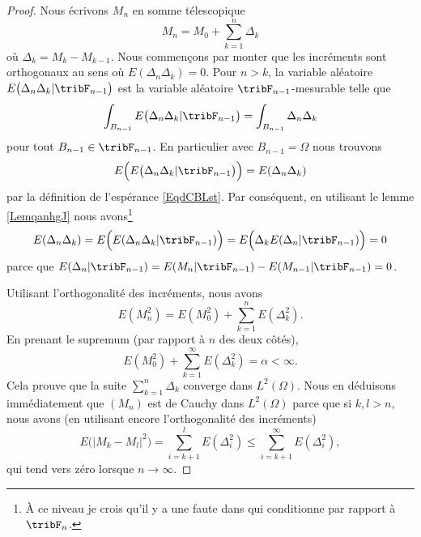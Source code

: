 \begin{proof}
    Nous écrivons \( M_n\) en somme télescopique
    \begin{equation}
        M_n=M_0+\sum_{k=1}^n\Delta_k
    \end{equation}
    où \( \Delta_k=M_k-M_{k-1}\). Nous commençons par monter que les incréments sont orthogonaux au sens où \( E(\Delta_n\Delta_k)=0\). Pour \( n>k\), la variable aléatoire \( E\big( \Delta_n\Delta_k|\tribF_{n-1} \big)\) est la variable aléatoire \( \tribF_{n-1}\)-mesurable telle que
    \begin{equation}
        \int_{B_{n-1}}E\big( \Delta_n\Delta_k|\tribF_{n-1} \big)=\int_{B_{n-1}}\Delta_n\Delta_k
    \end{equation}
    pour tout \( B_{n-1}\in\tribF_{n-1}\). En particulier avec \( B_{n-1}=\Omega\) nous trouvons
    \begin{equation}
        E\Big( E\big( \Delta_n\Delta_k|\tribF_{n-1} \big)\Big)=E(\Delta_n\Delta_k)
    \end{equation}
    par la définition de l'espérance \eqref{EqdCBLst}. Par conséquent, en utilisant le lemme \ref{LemqanhgJ} nous avons\footnote{À ce niveau je crois qu'il y a une faute dans \cite{PMCmartinLP} qui conditionne par rapport à \( \tribF_n\).}
    \begin{equation}
        E(\Delta_n\Delta_k)=E\Big( E(\Delta_n\Delta_k|\tribF_{n-1}) \Big)=E\Big( \Delta_kE(\Delta_n|\tribF_{n-1}) \Big)=0
    \end{equation}
    parce que \( E(\Delta_n|\tribF_{n-1})=E(M_n|\tribF_{n-1})-E(M_{n-1}|\tribF_{n-1})=0\).

    Utilisant l'orthogonalité des incréments, nous avons
    \begin{equation}
        E(M_n^2)=E(M_0^2)+\sum_{k=1}^nE(\Delta_k^2).
    \end{equation}
    En prenant le supremum (par rapport à \( n\) des deux côtés),
    \begin{equation}
        E(M_0^2)+\sum_{k=1}^{\infty}E(\Delta_k^2)=\alpha<\infty.
    \end{equation}
    Cela prouve que la suite \( \sum_{k=1}^n\Delta_k\) converge dans \( L^2(\Omega)\). Nous en déduisons immédiatement que \( (M_n)\) est de Cauchy dans \( L^2(\Omega)\) parce que si \( k,l>n\), nous avons (en utilisant encore l'orthogonalité des incréments)
    \begin{equation}
        E\big( | M_k-M_l |^2 \big)=\sum_{i=k+1}^lE(\Delta_i^2)\leq\sum_{i=k+1}^{\infty}E(\Delta_i^2),
    \end{equation}
    qui tend vers zéro lorsque \( n\to\infty\).
\end{proof}

